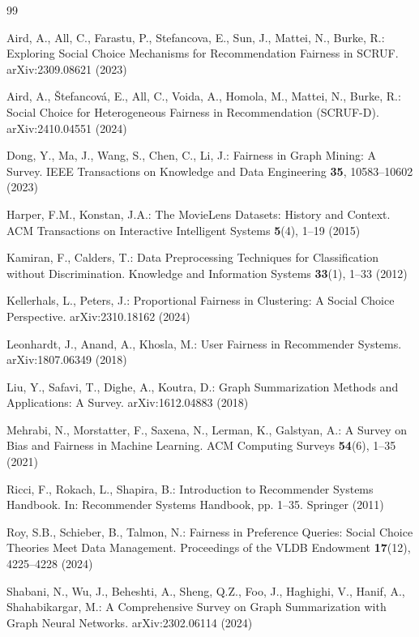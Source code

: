 \documentclass[12pt]{report}
\begin{document}
\begin{thebibliography}{99}
\footnotesize

Aird, A., All, C., Farastu, P., Stefancova, E., Sun, J., Mattei, N., Burke, R.:
Exploring Social Choice Mechanisms for Recommendation Fairness in SCRUF.
arXiv:2309.08621 (2023)

Aird, A., Štefancová, E., All, C., Voida, A., Homola, M., Mattei, N., Burke, R.:
Social Choice for Heterogeneous Fairness in Recommendation (SCRUF-D).
arXiv:2410.04551 (2024)

Dong, Y., Ma, J., Wang, S., Chen, C., Li, J.:
Fairness in Graph Mining: A Survey.
IEEE Transactions on Knowledge and Data Engineering \textbf{35}, 10583--10602 (2023)

Harper, F.M., Konstan, J.A.:
The MovieLens Datasets: History and Context.
ACM Transactions on Interactive Intelligent Systems \textbf{5}(4), 1--19 (2015)

Kamiran, F., Calders, T.:
Data Preprocessing Techniques for Classification without Discrimination.
Knowledge and Information Systems \textbf{33}(1), 1--33 (2012)

Kellerhals, L., Peters, J.:
Proportional Fairness in Clustering: A Social Choice Perspective.
arXiv:2310.18162 (2024)

Leonhardt, J., Anand, A., Khosla, M.:
User Fairness in Recommender Systems.
arXiv:1807.06349 (2018)

Liu, Y., Safavi, T., Dighe, A., Koutra, D.:
Graph Summarization Methods and Applications: A Survey.
arXiv:1612.04883 (2018)

Mehrabi, N., Morstatter, F., Saxena, N., Lerman, K., Galstyan, A.:
A Survey on Bias and Fairness in Machine Learning.
ACM Computing Surveys \textbf{54}(6), 1--35 (2021)

Ricci, F., Rokach, L., Shapira, B.:
Introduction to Recommender Systems Handbook.
In: Recommender Systems Handbook, pp. 1--35. Springer (2011)

Roy, S.B., Schieber, B., Talmon, N.:
Fairness in Preference Queries: Social Choice Theories Meet Data Management.
Proceedings of the VLDB Endowment \textbf{17}(12), 4225--4228 (2024)

Shabani, N., Wu, J., Beheshti, A., Sheng, Q.Z., Foo, J., Haghighi, V., Hanif, A., Shahabikargar, M.:
A Comprehensive Survey on Graph Summarization with Graph Neural Networks.
arXiv:2302.06114 (2024)


\end{thebibliography}
\end{document}

